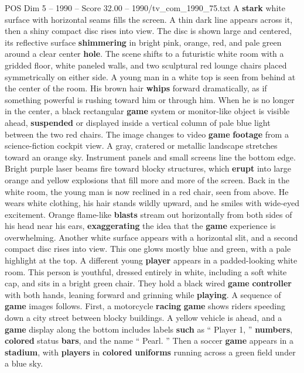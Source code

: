 \begin{textsample}{POS Dim 5 – 1990 – Score 32.00 – 1990/tv\_com\_1990\_75.txt}  \label{ex:f5_pos_002}
A \textbf{stark} white surface with horizontal seams fills the screen.
A thin dark line appears across it, then a shiny compact disc rises into view.
The disc is shown large and centered, its reflective surface \textbf{shimmering} in bright pink, orange, red, and pale green around a clear center \textbf{hole}.
The scene shifts to a futuristic white room with a gridded floor, white paneled walls, and two sculptural red lounge chairs placed symmetrically on either side.
A young man in a white top is seen from behind at the center of the room.
His brown hair \textbf{whips} forward dramatically, as if something powerful is rushing toward him or through him.
When he is no longer in the center, a black rectangular \textbf{game} system or monitor-like object is visible ahead, \textbf{suspended} or displayed inside a vertical column of pale blue light between the two red chairs.
The image changes to video \textbf{game} \textbf{footage} from a science-fiction cockpit view.
A gray, cratered or metallic landscape stretches toward an orange sky.
Instrument panels and small screens line the bottom edge.
Bright purple laser beams fire toward blocky structures, which \textbf{erupt} into large orange and yellow explosions that fill more and more of the screen.
Back in the white room, the young man is now reclined in a red chair, seen from above.
He wears white clothing, his hair stands wildly upward, and he smiles with wide-eyed excitement.
Orange flame-like \textbf{blasts} stream out horizontally from both sides of his head near his ears, \textbf{exaggerating} the idea that the \textbf{game} experience is overwhelming.
Another white surface appears with a horizontal slit, and a second compact disc rises into view.
This one glows mostly blue and green, with a pale highlight at the top.
A different young \textbf{player} appears in a padded-looking white room.
This person is youthful, dressed entirely in white, including a soft white cap, and sits in a bright green chair.
They hold a black wired \textbf{game} \textbf{controller} with both hands, leaning forward and grinning while \textbf{playing}.
A sequence of \textbf{game} images follows.
First, a motorcycle \textbf{racing} \textbf{game} shows riders speeding down a city street between blocky buildings.
A yellow vehicle is ahead, and a \textbf{game} display along the bottom includes labels \textbf{such} as “ Player 1, ” \textbf{numbers}, \textbf{colored} status \textbf{bars}, and the name “ Pearl. ” Then a soccer \textbf{game} appears in a \textbf{stadium}, with \textbf{players} in \textbf{colored} \textbf{uniforms} running across a green field under a blue sky.

\end{textsample}
